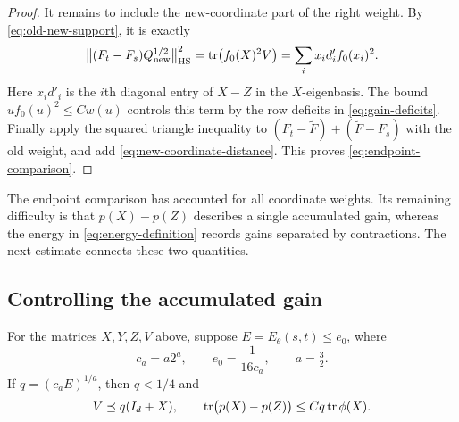 \begin{proof}
It remains to include the new-coordinate part of the right weight.
By \eqref{eq:old-new-support}, it is exactly
\begin{equation}
 \bigl\lVert(F_t-F_s)Q_{\rm new}^{1/2}\bigr\rVert_{\mathrm{HS}}^2
   =\operatorname{tr}\bigl(f_0(X)^2V\bigr)
   =\sum_i x_i d'_i f_0(x_i)^2.
 \label{eq:new-coordinate-distance}
\end{equation}
Here $x_id'_i$ is the $i$th diagonal entry of $X-Z$ in the
$X$-eigenbasis.  The bound $u f_0(u)^2\le Cw(u)$ controls this
term by the row deficits in \eqref{eq:gain-deficits}.
Finally apply the squared triangle inequality to
$(F_t-\widetilde F)+(\widetilde F-F_s)$ with the old weight,
and add \eqref{eq:new-coordinate-distance}.  This proves
\eqref{eq:endpoint-comparison}.
\end{proof}

The endpoint comparison has accounted for all coordinate weights.
Its remaining difficulty is that $p(X)-p(Z)$ describes a single
accumulated gain, whereas the energy in
\eqref{eq:energy-definition} records gains separated by contractions.
The next estimate connects these two quantities.

\subsection{Controlling the accumulated gain}

\begin{lemma}
\label{lem:direct-gain}
For the matrices $X,Y,Z,V$ above, suppose
$E=E_\theta(s,t)\le e_0$, where
\[
 c_a=a2^a,\qquad e_0=\frac1{16c_a},\qquad a=\tfrac32.
\]
If $q=(c_aE)^{1/a}$, then $q<1/4$ and
\begin{equation}
 V\preceq q(I_d+X),
 \qquad
 \operatorname{tr}\bigl(p(X)-p(Z)\bigr)\le Cq\operatorname{tr}\phi(X).
 \label{eq:direct-gain}
\end{equation}
\end{lemma}

